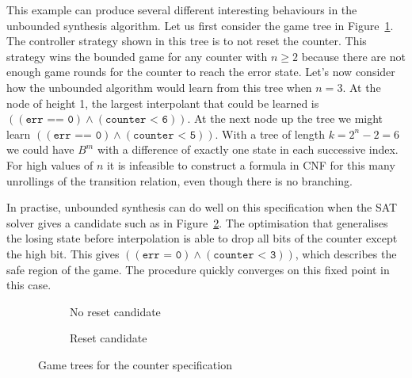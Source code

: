 This example can produce several different interesting behaviours in the unbounded synthesis algorithm. Let us first consider the game tree in Figure~\ref{fig:limitationAGTa}. The controller strategy shown in this tree is to not reset the counter. This strategy wins the bounded game for any counter with $n \geq 2$ because there are not enough game rounds for the counter to reach the error state. Let's now consider how the unbounded algorithm would learn from this tree when $n = 3$. At the node of height 1, the largest interpolant that could be learned is $((\texttt{err == 0}) \land (\texttt{counter < 6}))$. At the next node up the tree we might learn $((\texttt{err == 0}) \land (\texttt{counter < 5}))$. With a tree of length $k = 2^n - 2 = 6$ we could have $B^m$ with a difference of exactly one state in each successive index. For high values of $n$ it is infeasible to construct a formula in CNF for this many unrollings of the transition relation, even though there is no branching.

In practise, unbounded synthesis can do well on this specification when the SAT solver gives a candidate such as in Figure~\ref{fig:limitationAGTb}. The optimisation that generalises the losing state before interpolation is able to drop all bits of the counter except the high bit. This gives $((\texttt{err = 0}) \land (\texttt{counter < 3}))$, which describes the safe region of the game. The procedure quickly converges on this fixed point in this case.

\begin{figure}
    \begin{subfigure}[t]{0.5\textwidth}
        \centering
        \caption{No reset candidate}
        \label{fig:limitationAGTa}
    \end{subfigure}
    \begin{subfigure}[t]{0.5\textwidth}
        \centering
        \caption{Reset candidate}
        \label{fig:limitationAGTb}
    \end{subfigure}
    \caption{Game trees for the counter specification}
    \label{fig:limitationAGT}
\end{figure}

